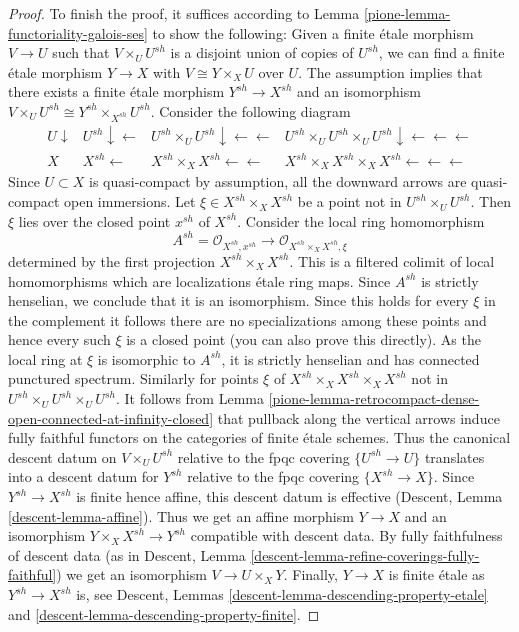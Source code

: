 \begin{proof}
\medskip\noindent
To finish the proof, it suffices according to
Lemma \ref{pione-lemma-functoriality-galois-ses}
to show the following: Given a finite \'etale morphism
$V \to U$ such that $V \times_U U^{sh}$ is a disjoint
union of copies of $U^{sh}$, we can find a finite \'etale
morphism $Y \to X$ with $V \cong Y \times_X U$ over $U$.
The assumption implies that there exists a finite \'etale
morphism $Y^{sh} \to X^{sh}$ and an isomorphism
$V \times_U U^{sh} \cong Y^{sh} \times_{X^{sh}} U^{sh}$.
Consider the following diagram
$$
\begin{array}{cccc}U \downarrow & U^{sh} \downarrow\longleftarrow & U^{sh} \times_U U^{sh} \downarrow\longleftarrow\longleftarrow & U^{sh} \times_U U^{sh} \times_U U^{sh}
\downarrow\longleftarrow\longleftarrow\longleftarrow \\ X & X^{sh} \longleftarrow & X^{sh} \times_X X^{sh} \longleftarrow\longleftarrow & X^{sh} \times_X X^{sh} \times_X X^{sh} \longleftarrow\longleftarrow\longleftarrow\end{array}
$$
Since $U \subset X$ is quasi-compact by assumption, all the
downward arrows are quasi-compact open immersions.
Let $\xi \in X^{sh} \times_X X^{sh}$ be a point not
in $U^{sh} \times_U U^{sh}$. Then $\xi$ lies over the closed
point $x^{sh}$ of $X^{sh}$.
Consider the local ring homomorphism
$$
A^{sh} = \mathcal{O}_{X^{sh}, x^{sh}} \to
\mathcal{O}_{X^{sh} \times_X X^{sh}, \xi}
$$
determined by the first projection $X^{sh} \times_X X^{sh}$.
This is a filtered colimit of local homomorphisms which are
localizations \'etale ring maps.
Since $A^{sh}$ is strictly henselian, we conclude that it is an
isomorphism. Since this holds for every $\xi$ in the complement
it follows there are no specializations among these points and
hence every such $\xi$ is a closed point (you can also prove
this directly). As the local ring at $\xi$ is isomorphic
to $A^{sh}$, it is strictly henselian and has connected punctured spectrum.
Similarly for points $\xi$ of $X^{sh} \times_X X^{sh} \times_X X^{sh}$ not
in $U^{sh} \times_U U^{sh} \times_U U^{sh}$. It follows from
Lemma \ref{pione-lemma-retrocompact-dense-open-connected-at-infinity-closed}
that pullback along the vertical arrows induce fully faithful functors on
the categories of finite \'etale schemes. Thus the
canonical descent datum on $V \times_U U^{sh}$ relative to
the fpqc covering $\{U^{sh} \to U\}$ translates into a
descent datum for $Y^{sh}$ relative to the fpqc covering $\{X^{sh} \to X\}$.
Since $Y^{sh} \to X^{sh}$ is finite hence affine, this descent datum is
effective (Descent, Lemma \ref{descent-lemma-affine}).
Thus we get an affine morphism $Y \to X$ and an isomorphism
$Y \times_X X^{sh} \to Y^{sh}$ compatible with descent data.
By fully faithfulness of descent data
(as in Descent, Lemma \ref{descent-lemma-refine-coverings-fully-faithful})
we get an isomorphism $V \to U \times_X Y$.
Finally, $Y \to X$ is finite \'etale as $Y^{sh} \to X^{sh}$ is, see
Descent, Lemmas \ref{descent-lemma-descending-property-etale} and
\ref{descent-lemma-descending-property-finite}.
\end{proof}

